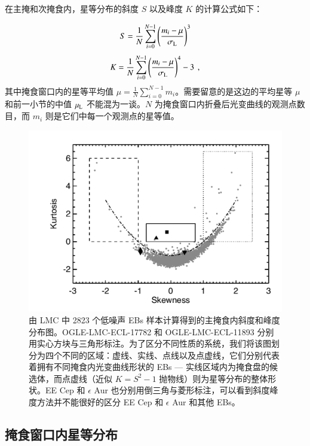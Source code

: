 在主掩和次掩食内，星等分布的斜度 $S$ 以及峰度 $K$ 的计算公式如下：

\begin{equation} \label{eq:skew}
S =  \frac{1}{N} \sum_{i=0}^{N-1} \left(\frac{m_i - \mu}{\sigma_\mathrm{L}}\right)^3 
\end{equation}  
\begin{equation} \label{eq:kur}
K =  \frac{1}{N} \sum_{i=0}^{N-1} \left(\frac{m_i - \mu}{\sigma_\mathrm{L}}\right)^4 - 3 \, \ , 
\end{equation} 
其中掩食窗口内的星等平均值 $\mu = \frac{1}{N} \sum_{i=0}^{N-1} m_i$。需要留意的是这边的平均星等 
$\mu$ 和前一小节的中值 $\mu_\mathrm{L}$ 不能混为一谈。$N$ 为掩食窗口内折叠后光变曲线的观测点数
目，而 $m_i$ 则是它们中每一个观测点的星等值。


\begin{figure}[t]
\centering
\includegraphics[width=1.0\textwidth,trim={0.4in 0.2in 0 0}]{figures/chapter3/f5_lmcks.pdf}
\caption{由 LMC 中 2823 个低噪声 EBs 样本计算得到的主掩食内斜度和峰度分布图。OGLE-LMC-ECL-17782 和 OGLE-LMC-ECL-11893 分别用实心方块与三角形标注。为了区分不同性质的系统，我们将该图划分为四个不同的区域：虚线、实线、点线以及点虚线，它们分别代表着拥有不同掩食内光变曲线形状的 EBs --- 实线区域内为掩食盘的候选体，而点虚线（近似 $K=S^2-1$ 抛物线）则为星等分布的整体形状。EE Cep 和 $\epsilon$ Aur 也分别用倒三角与菱形标注，可以看到斜度峰度方法并不能很好的区分 EE Cep 和 $\epsilon$ Aur 和其他 EBs。}
\label{fig:lmcks}
\end{figure}


\subsection{掩食窗口内星等分布} \label{sec:discebresult}

